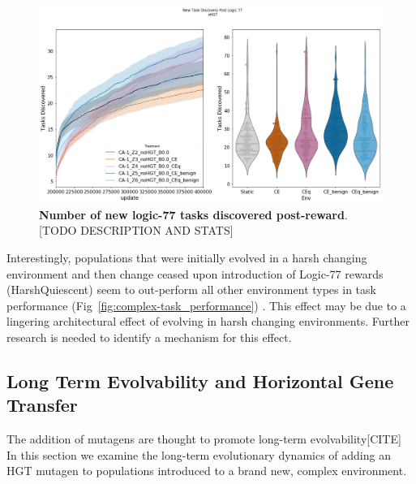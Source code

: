 \documentclass[PhD]{msu-thesis}
\begin{document}
	\begin{figure}[!h]
	\includegraphics[trim={0 0 0 0}, clip, width=0.75\columnwidth]{figures/LTE/lte-complex-post_reward_task_discovery.png}
	\caption{\textbf{Number of new logic-77 tasks discovered post-reward}. [TODO DESCRIPTION AND STATS]%
	}
	\label{fig:complex-task_discovery}
	\end{figure}

Interestingly, populations that were initially evolved in a harsh changing environment and then change ceased upon introduction of Logic-77 rewards (HarshQuiescent)
seem to out-perform all other environment types in task performance (Fig~\ref{fig:complex-task_performance}) . This effect may be due to a lingering architectural effect of evolving in harsh changing environments.
Further research is needed to identify a mechanism for this effect.



\subsection{Long Term Evolvability and Horizontal Gene Transfer}
The addition of mutagens
are thought to promote long-term evolvability[CITE] In this section we examine the long-term evolutionary dynamics of adding an HGT mutagen to populations introduced to a brand new, complex environment.
\end{document}

